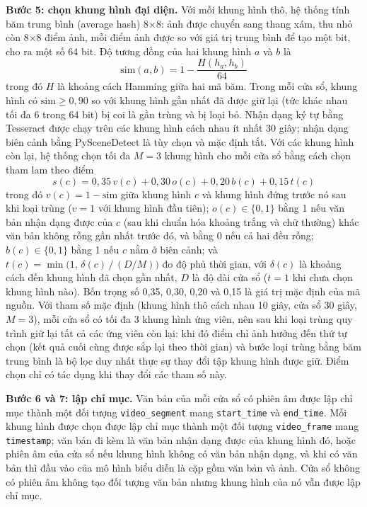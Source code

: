 \bigbreak\noindent
\textbf{Bước 5: chọn khung hình đại diện.} Với mỗi khung hình thô, hệ thống tính băm trung bình (average hash) 8$\times$8: ảnh được chuyển sang thang xám, thu nhỏ còn 8$\times$8 điểm ảnh, mỗi điểm ảnh được so với giá trị trung bình để tạo một bit, cho ra một số 64 bit. Độ tương đồng của hai khung hình $a$ và $b$ là
\begin{equation}\label{eq:ahash}
    \mathrm{sim}(a,b) = 1 - \frac{H(h_a, h_b)}{64}
\end{equation}
trong đó $H$ là khoảng cách Hamming giữa hai mã băm. Trong mỗi cửa sổ, khung hình có $\mathrm{sim}\ge 0{,}90$ so với khung hình gần nhất đã được giữ lại (tức khác nhau tối đa 6 trong 64 bit) bị coi là gần trùng và bị loại bỏ. Nhận dạng ký tự bằng Tesseract được chạy trên các khung hình cách nhau ít nhất 30 giây; nhận dạng biên cảnh bằng PySceneDetect là tùy chọn và mặc định tắt. Với các khung hình còn lại, hệ thống chọn tối đa $M=3$ khung hình cho mỗi cửa sổ bằng cách chọn tham lam theo điểm
\begin{equation}\label{eq:frame-score}
    s(c) = 0{,}35\, v(c) + 0{,}30\, o(c) + 0{,}20\, b(c) + 0{,}15\, t(c)
\end{equation}
trong đó $v(c)=1-\mathrm{sim}$ giữa khung hình $c$ và khung hình đứng trước nó sau khi loại trùng ($v=1$ với khung hình đầu tiên); $o(c)\in\{0,1\}$ bằng 1 nếu văn bản nhận dạng được của $c$ (sau khi chuẩn hóa khoảng trắng và chữ thường) khác văn bản không rỗng gần nhất trước đó, và bằng 0 nếu cả hai đều rỗng; $b(c)\in\{0,1\}$ bằng 1 nếu $c$ nằm ở biên cảnh; và $t(c)=\min\bigl(1,\, \delta(c) \,/\, (D/M)\bigr)$ đo độ phủ thời gian, với $\delta(c)$ là khoảng cách đến khung hình đã chọn gần nhất, $D$ là độ dài cửa sổ ($t=1$ khi chưa chọn khung hình nào). Bốn trọng số 0,35, 0,30, 0,20 và 0,15 là giá trị mặc định của mã nguồn. Với tham số mặc định (khung hình thô cách nhau 10 giây, cửa sổ 30 giây, $M=3$), mỗi cửa sổ có tối đa 3 khung hình ứng viên, nên sau khi loại trùng quy trình giữ lại tất cả các ứng viên còn lại: khi đó điểm chỉ ảnh hưởng đến thứ tự chọn (kết quả cuối cùng được sắp lại theo thời gian) và bước loại trùng bằng băm trung bình là bộ lọc duy nhất thực sự thay đổi tập khung hình được giữ. Điểm chọn chỉ có tác dụng khi thay đổi các tham số này.

\bigbreak\noindent
\textbf{Bước 6 và 7: lập chỉ mục.} Văn bản của mỗi cửa sổ có phiên âm được lập chỉ mục thành một đối tượng \texttt{video\_segment} mang \texttt{start\_time} và \texttt{end\_time}. Mỗi khung hình được chọn được lập chỉ mục thành một đối tượng \texttt{video\_frame} mang \texttt{timestamp}; văn bản đi kèm là văn bản nhận dạng được của khung hình đó, hoặc phiên âm của cửa sổ nếu khung hình không có văn bản nhận dạng, và khi có văn bản thì đầu vào của mô hình biểu diễn là cặp gồm văn bản và ảnh. Cửa sổ không có phiên âm không tạo đối tượng văn bản nhưng khung hình của nó vẫn được lập chỉ mục.

